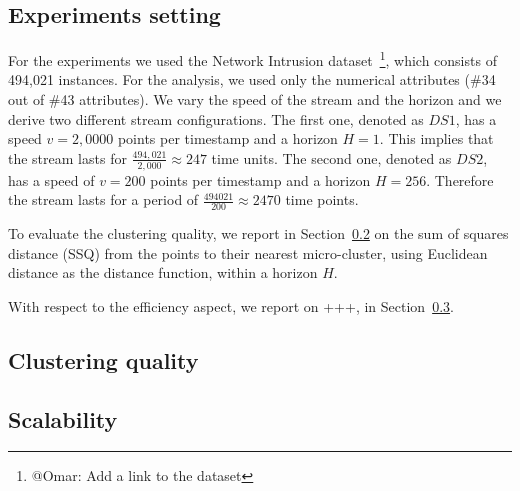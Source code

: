 \subsection{Experiments setting}
For the experiments we used the Network Intrusion dataset~\footnote{@Omar: Add a link to the dataset}, which consists of 494,021 instances. For the analysis, we used only the numerical attributes (\#34 out of \#43 attributes).
We vary the speed of the stream and the horizon and we derive two different stream configurations.
The first one, denoted as $DS1$, has a speed $v=2,0000$ points per timestamp and a horizon $H=1$. This implies that the stream lasts for $\frac{494,021}{2,000} \approx 247$ time units. 
The second one, denoted as $DS2$, has a speed of $v=200$ points per timestamp and a horizon $H=256$. Therefore the stream lasts for a period of $\frac{494021}{200} \approx 2470$ time points.

To evaluate the clustering quality, we report in Section~\ref{sec:expQuality} on the sum of squares distance (SSQ) from the points to their nearest micro-cluster, using Euclidean distance as the distance function, within a horizon $H$.

With respect to the efficiency aspect, we report on \color{red}+++\color{black}, in Section~\ref{sec:expScalability}. 

\subsection{Clustering quality}
\label{sec:expQuality}



\subsection{Scalability}
\label{sec:expScalability}
